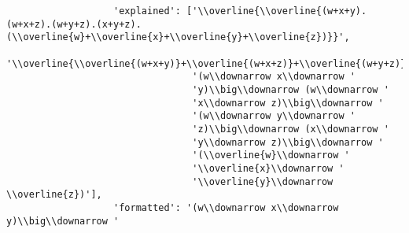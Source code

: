 \begin{verbatim}
                   'explained': ['\\overline{\\overline{(w+x+y).(w+x+z).(w+y+z).(x+y+z).(\\overline{w}+\\overline{x}+\\overline{y}+\\overline{z})}}',
                                 '\\overline{\\overline{(w+x+y)}+\\overline{(w+x+z)}+\\overline{(w+y+z)}+\\overline{(x+y+z)}+\\overline{(\\overline{w}+\\overline{x}+\\overline{y}+\\overline{z})}}',
                                 '(w\\downarrow x\\downarrow '
                                 'y)\\big\\downarrow (w\\downarrow '
                                 'x\\downarrow z)\\big\\downarrow '
                                 '(w\\downarrow y\\downarrow '
                                 'z)\\big\\downarrow (x\\downarrow '
                                 'y\\downarrow z)\\big\\downarrow '
                                 '(\\overline{w}\\downarrow '
                                 '\\overline{x}\\downarrow '
                                 '\\overline{y}\\downarrow \\overline{z})'],
                   'formatted': '(w\\downarrow x\\downarrow y)\\big\\downarrow '

\end{verbatim}
